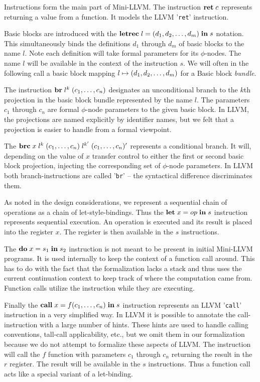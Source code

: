 \documentclass[a4paper, oneside, 10pt, draft]{memoir}
\begin{document}
Instructions form the main part of Mini-LLVM. The instruction
$\mathbf{ret} \; c$ represents returning a value from a function. It models the
LLVM '\texttt{ret}' instruction.

Basic blocks are introduced with the $\mathbf{letrec} \; l = (d_1, d_2, \dotsc, d_m) \; \mathbf{in} \; s$
notation. This simultaneously binds the definitions $d_1$ through
$d_m$ of basic blocks to the name $l$. Note each definition will take
formal parameters for its $\phi$-nodes. The name $l$ will be
available in the context of the instruction $s$. We will often in the
following call a basic block mapping $l \mapsto (d_1, d_2, \dotsc, d_m)$
for a Basic block \emph{bundle}.

The instruction $\mathbf{br} \; l^k \; (c_1, \dotsc, c_n)$ designates an
unconditional branch to the $k$th projection in the basic block bundle
represented by the name $l$. The parameters $c_1$ through $c_n$ are
formal $\phi$-node parameters to the given basic block. In LLVM, the
projections are named explicitly by identifier names, but we felt that
a projection is easier to handle from a formal viewpoint.

The $\mathbf{brc} \; x \; l^k \; (c_1, \dotsc, c_n) \; l^{k'} \; (c_1, \dotsc, c_n)'$ represents a conditional
branch. It will, depending on the value of $x$ transfer control to
either the first or second basic block projection, injecting the
corresponding set of $\phi$-node parameters. In LLVM both
branch-instructions are called '\texttt{br}' -- the syntactical
difference discriminates them.

As noted in the design considerations, we represent a sequential chain
of operations as a chain of let-style-bindings. Thus the
$\mathbf{let} \; x = op \; \mathbf{in} \; s$ instruction represents sequential execution. An
operation is executed and its result is placed into the register
$x$. The register is then available in the $s$ instructions.

The $\mathbf{do} \; x = s_1 \; \mathbf{in} \; s_2$ instruction is not meant to be present in
initial Mini-LLVM programs. It is used internally to keep the context
of a function call around. This has to do with the fact that the
formalization lacks a stack and thus uses the current continuation
context to keep track of where the computation came from. Function
calls utilize the instruction while they are executing.

Finally the $\mathbf{call} \; x = f (c_1, \dotsc, c_n)\; \mathbf{in} \; s$ instruction
represents an LLVM '\texttt{call}' instruction in a very simplified
way. In LLVM it is possible to annotate the call-instruction with a
large number of hints. These hints are used to handle calling
conventions, tall-call applicability, etc., but we omit them in our
formalization because we do not attempt to formalize these aspects of
LLVM. The instruction will call the $f$ function with parameters $c_1$
through $c_n$ returning the result in the $r$ register. The result
will be available in the $s$ instructions. Thus a function call acts
like a special variant of a let-binding.
\end{document}
